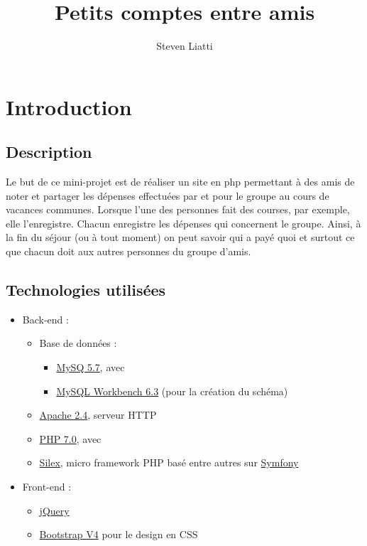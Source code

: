 \documentclass[a4paper, 11pt]{article}
\begin{document}
\title{Petits comptes entre amis} 
\author{Steven Liatti} 
\maketitle

\section{Introduction}
\subsection{Description}
Le but de ce mini-projet est de réaliser un site en php permettant à des amis de noter et
partager les dépenses effectuées par et pour le groupe au cours de vacances
communes. Lorsque l’une des personnes fait des courses, par exemple, elle l’enregistre.
Chacun enregistre les dépenses qui concernent le groupe. Ainsi, à la fin du séjour (ou à
tout moment) on peut savoir qui a payé quoi et surtout ce que chacun doit aux autres
personnes du groupe d’amis.

\subsection{Technologies utilisées}
\begin{itemize}
	\item Back-end :
	\begin{itemize}
		\item Base de données :
		\begin{itemize}
			\item \href{https://www.mysql.com/}{MySQ 5.7}, avec
			\item \href{https://www.mysql.com/products/workbench/}{MySQL Workbench 6.3} (pour la création du schéma)
		\end{itemize}
		\item \href{https://httpd.apache.org/}{Apache 2.4}, serveur HTTP
		\item \href{http://php.net/}{PHP 7.0}, avec
		\item \href{https://silex.symfony.com/}{Silex}, micro framework PHP basé entre autres sur \href{https://symfony.com/}{Symfony}
	\end{itemize}
	\item Front-end :
	\begin{itemize}
		\item \href{https://jquery.org/}{jQuery}
		\item \href{http://getbootstrap.com/}{Bootstrap V4} pour le design en CSS
	\end{itemize}
\end{itemize}
\end{document}
